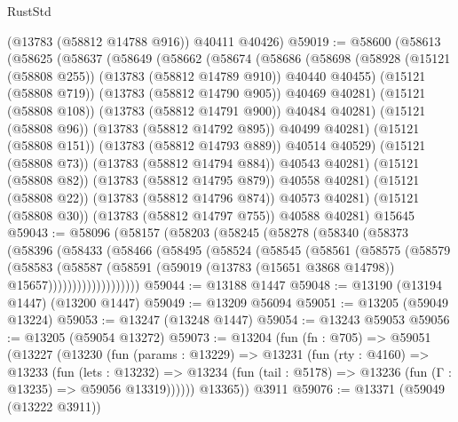 \begin{lexlean}{RustStd}
\begin{coremodule}
      (@13783 (@58812 @14788 @916))
      @40411
      @40426)
@59019 := @58600
    (@58613
      (@58625
        (@58637
          (@58649
            (@58662
              (@58674
                (@58686
                  (@58698
                    (@58928 (@15121 (@58808 @255)) (@13783 (@58812 @14789 @910)) @40440 @40455)
                    (@15121 (@58808 @719))
                    (@13783 (@58812 @14790 @905))
                    @40469
                    @40281)
                  (@15121 (@58808 @108))
                  (@13783 (@58812 @14791 @900))
                  @40484
                  @40281)
                (@15121 (@58808 @96))
                (@13783 (@58812 @14792 @895))
                @40499
                @40281)
              (@15121 (@58808 @151))
              (@13783 (@58812 @14793 @889))
              @40514
              @40529)
            (@15121 (@58808 @73))
            (@13783 (@58812 @14794 @884))
            @40543
            @40281)
          (@15121 (@58808 @82))
          (@13783 (@58812 @14795 @879))
          @40558
          @40281)
        (@15121 (@58808 @22))
        (@13783 (@58812 @14796 @874))
        @40573
        @40281)
      (@15121 (@58808 @30))
      (@13783 (@58812 @14797 @755))
      @40588
      @40281)
    @15645
@59043 := @58096
    (@58157
      (@58203
        (@58245
          (@58278
            (@58340
              (@58373
                (@58396
                  (@58433
                    (@58466
                      (@58495
                        (@58524
                          (@58545
                            (@58561
                              (@58575
                                (@58579
                                  (@58583
                                    (@58587
                                      (@58591
                                        (@59019
                                          (@13783 (@15651 @3868 @14798))
                                          @15657)))))))))))))))))))
@59044 := @13188 @1447
@59048 := @13190 (@13194 @1447) (@13200 @1447)
@59049 := @13209 @56094
@59051 := @13205 (@59049 @13224)
@59053 := @13247 (@13248 @1447)
@59054 := @13243 @59053
@59056 := @13205 (@59054 @13272)
@59073 := @13204
    (fun (fn : @705) =>
    @59051
      (@13227
        (@13230
          (fun (params : @13229) =>
          @13231
            (fun (rty : @4160) =>
            @13233
              (fun (lets : @13232) =>
              @13234 (fun (tail : @5178) => @13236 (fun (Γ : @13235) => @59056 @13319))))))
        @13365))
    @3911
@59076 := @13371 (@59049 (@13222 @3911))

\end{coremodule}
\end{lexlean}
